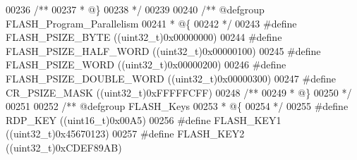 \begin{DoxyCode}
00236 \textcolor{comment}{/**}
00237 \textcolor{comment}{  * @\}}
00238 \textcolor{comment}{  */}
00239 
00240 \textcolor{comment}{/** @defgroup FLASH\_Program\_Parallelism   }
00241 \textcolor{comment}{  * @\{}
00242 \textcolor{comment}{  */}
00243 \textcolor{preprocessor}{#}\textcolor{preprocessor}{define} \textcolor{preprocessor}{FLASH\_PSIZE\_BYTE}           \textcolor{preprocessor}{(}\textcolor{preprocessor}{(}\textcolor{preprocessor}{uint32\_t}\textcolor{preprocessor}{)}0x00000000\textcolor{preprocessor}{)}
00244 \textcolor{preprocessor}{#}\textcolor{preprocessor}{define} \textcolor{preprocessor}{FLASH\_PSIZE\_HALF\_WORD}      \textcolor{preprocessor}{(}\textcolor{preprocessor}{(}\textcolor{preprocessor}{uint32\_t}\textcolor{preprocessor}{)}0x00000100\textcolor{preprocessor}{)}
00245 \textcolor{preprocessor}{#}\textcolor{preprocessor}{define} \textcolor{preprocessor}{FLASH\_PSIZE\_WORD}           \textcolor{preprocessor}{(}\textcolor{preprocessor}{(}\textcolor{preprocessor}{uint32\_t}\textcolor{preprocessor}{)}0x00000200\textcolor{preprocessor}{)}
00246 \textcolor{preprocessor}{#}\textcolor{preprocessor}{define} \textcolor{preprocessor}{FLASH\_PSIZE\_DOUBLE\_WORD}    \textcolor{preprocessor}{(}\textcolor{preprocessor}{(}\textcolor{preprocessor}{uint32\_t}\textcolor{preprocessor}{)}0x00000300\textcolor{preprocessor}{)}
00247 \textcolor{preprocessor}{#}\textcolor{preprocessor}{define} \textcolor{preprocessor}{CR\_PSIZE\_MASK}              \textcolor{preprocessor}{(}\textcolor{preprocessor}{(}\textcolor{preprocessor}{uint32\_t}\textcolor{preprocessor}{)}0xFFFFFCFF\textcolor{preprocessor}{)}
00248 \textcolor{comment}{/**}
00249 \textcolor{comment}{  * @\}}
00250 \textcolor{comment}{  */}
00251 
00252 \textcolor{comment}{/** @defgroup FLASH\_Keys }
00253 \textcolor{comment}{  * @\{}
00254 \textcolor{comment}{  */}
00255 \textcolor{preprocessor}{#}\textcolor{preprocessor}{define} \textcolor{preprocessor}{RDP\_KEY}                  \textcolor{preprocessor}{(}\textcolor{preprocessor}{(}\textcolor{preprocessor}{uint16\_t}\textcolor{preprocessor}{)}0x00A5\textcolor{preprocessor}{)}
00256 \textcolor{preprocessor}{#}\textcolor{preprocessor}{define} \textcolor{preprocessor}{FLASH\_KEY1}               \textcolor{preprocessor}{(}\textcolor{preprocessor}{(}\textcolor{preprocessor}{uint32\_t}\textcolor{preprocessor}{)}0x45670123\textcolor{preprocessor}{)}
00257 \textcolor{preprocessor}{#}\textcolor{preprocessor}{define} \textcolor{preprocessor}{FLASH\_KEY2}               \textcolor{preprocessor}{(}\textcolor{preprocessor}{(}\textcolor{preprocessor}{uint32\_t}\textcolor{preprocessor}{)}0xCDEF89AB\textcolor{preprocessor}{)}

\end{DoxyCode}

